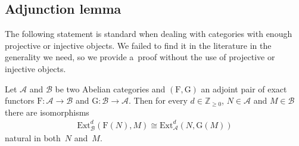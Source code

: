 \documentclass[pdftex]{sigma}
\begin{document}
\subsection{Adjunction lemma}%

The following statement is standard when dealing with categories with enough projective or injective objects.
We failed to f\/ind it in the literature in the generality we need, so we provide a~proof without the use of projective or
injective objects.

\begin{proposition}
\label{adjlem}
Let $\mathcal{A}$ and $\mathcal{B}$ be two Abelian categories and $(\mathrm{F},\mathrm{G})$ an adjoint pair of exact
functors $\mathrm{F}:\mathcal{A}\to \mathcal{B}$ and $\mathrm{G}:\mathcal{B}\to \mathcal{A}$.
Then for every $d\in\mathbb{Z}_{\geq 0}$, $N\in \mathcal{A}$ and $M\in \mathcal{B}$ there are isomorphisms
\begin{gather*}
\mathrm{Ext}^d_{\mathcal{B}}(\mathrm{F}(N),M)\cong \mathrm{Ext}^d_{\mathcal{A}}(N,\mathrm{G}(M))
\end{gather*}
natural in both~$N$ and~$M$.
\end{proposition}
\end{document}
